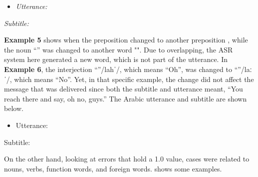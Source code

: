 \documentclass[english]{textolivre}
\newcommand{\ipa}[1]{{\ipafont #1}}
\begin{document}
\begin{itemize}
	\item
	\emph{Utterance: }
\end{itemize}

\emph{Subtitle: }


\textbf{Example 5} shows when the preposition  changed to another
preposition , while the noun ``'' was changed to another
word "". Due to overlapping, the ASR system here generated a
new word, which is not part of the utterance. In \textbf{Example 6}, the
interjection ``''\ipa{/lahˈ/}, which means ``Oh'', was changed to
``''\ipa{/laːˈ/}, which means ``No''. Yet, in that specific example,
the change did not affect the message that was delivered since both the
subtitle and utterance meant, ``You reach there and say, oh no, guys.''
The Arabic utterance and subtitle are shown below.


\begin{itemize}
\item Utterance: \emph{}
\end{itemize}

Subtitle: 

On the other hand, looking at errors that hold a 1.0 value, cases were
related to nouns, verbs, function words, and foreign words. 
shows some examples.
\end{document}
